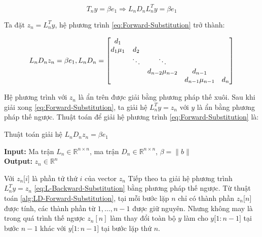 \documentclass[14pt, a4paper]{article}
\numberwithin{equation}{section}
\numberwithin{algorithm}{section}
\numberwithin{figure}{section}
\numberwithin{dl}{section}
\numberwithin{md}{section}
\numberwithin{bd}{section}
\numberwithin{dn}{section}
\begin{document}
\begin{equation} \label{eq:Forward-Substitution}
    T_n y = \beta e_1 \Rightarrow L_n D_n L_n^T y = \beta e_1
\end{equation}

Ta đặt $z_n = L_n^T y$, hệ phương trình \ref{eq:Forward-Substitution} trở thành:

\begin{equation}
    L_n D_n z_n = \beta e_1, L_n D_n = \begin{bmatrix} d_1 & \thickspace & \thickspace & \thickspace & \thickspace \\
        d_1\mu_1 & d_2 & \thickspace & \thickspace & \thickspace \\
        \thickspace & \ddots & \ddots & \thickspace & \thickspace \\
        \thickspace & \thickspace & d_{n-2}\mu_{n-2} & d_{n-1} & \thickspace \\
        \thickspace & \thickspace & \thickspace & d_{n-1}\mu_{n-1} & d_n \end{bmatrix}
\end{equation}

Hệ phương trình với $z_n$ là ẩn trên được giải bằng phương pháp thế xuôi. Sau khi giải xong \ref{eq:Forward-Substitution}, ta giải hệ $L_n^T y = z_n$ với $y$ là ẩn bằng phương pháp thế ngược.
Thuật toán để giải hệ phương trình \ref{eq:Forward-Substitution} là:

\begin{algorithm}
    \caption{Thuật toán giải hệ $L_n D_n z_n = \beta e_1$} \label{alg:LD-Forward-Substitution}
    \hspace*{\algorithmicindent} \textbf{Input:} {Ma trận $L_n \in \mathbb{R}^{n \times n}$, ma trận $D_n \in \mathbb{R}^{n \times n}$, $\beta = \lVert b \rVert$} \\
    \hspace*{\algorithmicindent} \textbf{Output:} {$z_n \in \mathbb{R}^n$}
    \begin{algorithmic}
        \EndFor
    \end{algorithmic}
\end{algorithm}

Với $z_n\lbrack i \rbrack$ là phần tử thứ $i$ của vector $z_n$
Tiếp theo ta giải hệ phương trình $L_n^T y = z_n$ \ref{eq:L-Backward-Substitution} bằng phương pháp thế ngược. Từ thuật toán \ref{alg:LD-Forward-Substitution}, tại mỗi bước lặp $n$ chỉ có thành phần $z_n\lbrack n \rbrack$ được tính, các thành phần từ $1, \dots, n-1$ được giữ nguyên. Nhưng không may là trong quá trình thế ngược $z_n[n]$ làm thay đổi toàn bộ $y$ làm cho $y\lbrack 1:n-1 \rbrack$ tại bước $n-1$ khác với $y \lbrack 1:n-1 \rbrack$ tại bước lặp thứ $n$.
\end{document}
